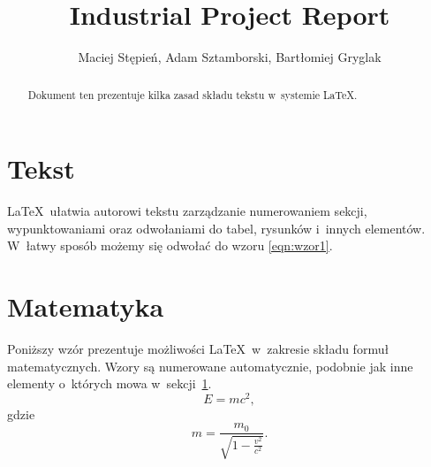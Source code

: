 \documentclass[11pt,a4paper]{article}
\title{Industrial Project Report}
\author{Maciej Stępień, Adam Sztamborski, Bartłomiej Gryglak}
\date{}
\begin{document}
\maketitle

\begin{abstract}
Dokument ten prezentuje kilka zasad składu tekstu
w~systemie \LaTeX.
\end{abstract}
\pagebreak

\tableofcontents
\pagebreak

\section{Tekst}\label{sec:tekst}
\LaTeX\ ułatwia autorowi tekstu zarządzanie
numerowaniem sekcji, wypunktowaniami oraz odwołaniami
do tabel, rysunków i~innych elementów. W~łatwy sposób
możemy się odwołać do wzoru \ref{eqn:wzor1}.
\pagebreak

\section{Matematyka}\label{sec:matematyka}
Poniższy wzór prezentuje możliwości \LaTeX\ w~zakresie
składu formuł matematycznych. Wzory są numerowane
automatycznie, podobnie jak inne elementy o~których
mowa w~sekcji~\ref{sec:tekst}.
\begin{equation}
    E = mc^2,
    \label{eqn:wzor1}
\end{equation}
gdzie
\begin{equation}
    m = \frac{m_0}{\sqrt{1-\frac{v^2}{c^2}}}.
\end{equation}
\end{document}
